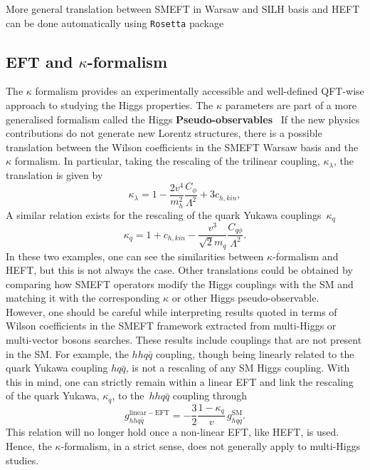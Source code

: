 More general translation between SMEFT in Warsaw and SILH basis and HEFT can be done automatically using \texttt{Rosetta} package~\cite{Falkowski:2015wza}
\subsection{EFT and $\kappa$-formalism \label{eftkappa}}
The $\kappa$ formalism provides an experimentally accessible and well-defined QFT-wise approach to studying the Higgs properties. The $\kappa$ parameters are part of a more generalised formalism called the Higgs \textbf{Pseudo-observables}~\cite{Gonzalez-Alonso:2014eva} 
If the new physics contributions do not generate new Lorentz structures, there is a possible translation between the Wilson coefficients in the SMEFT Warsaw basis and the $\kappa$ formalism. In particular, taking the rescaling of the trilinear coupling, $\kappa_\lambda$, the translation is given by
\begin{equation}
	\kappa_\lambda = 1-\frac{2v^4}{m_h^2} \frac{C_\phi}{\Lambda^2}+3 c_{h,kin},
\end{equation}
A similar relation exists for the rescaling of the quark Yukawa couplings~$\kappa_q$
\begin{equation}
	\kappa_q = 1+c_{h,kin}- \frac{v^3}{\sqrt{2}m_q}\frac{C_{q\phi}}{\Lambda^2}.
\end{equation}
In these two examples, one can see the similarities between $\kappa$-formalism and HEFT, but this is not always the case.  Other translations could be obtained by comparing how SMEFT operators modify the Higgs couplings with the SM and matching it with the corresponding $\kappa$ or other Higgs pseudo-observable.\\ 
However, one should be careful while interpreting results quoted in terms of Wilson coefficients in the SMEFT framework extracted from multi-Higgs or multi-vector bosons searches. These results include couplings that are not present in the SM. For example, the $hh q\bar{q}$ coupling, though being linearly related to the quark Yukawa coupling $h q\bar{q}$, is not a rescaling of any SM Higgs coupling. With this in mind, one can strictly remain within a linear EFT and link the rescaling of the quark Yukawa, $\kappa_q$, to the~$hh q\bar{q}$ coupling through
\begin{equation}
	g_{hhq\bar{q}}^{\mathrm{linear-EFT}} = -\frac{3}{2}\frac{1-\kappa_q}{v} \, g_{h q\bar{q}}^{\mathrm{SM}}.
\end{equation}
This relation will no longer hold once a non-linear EFT, like HEFT, is used. Hence, the $\kappa$-formalism, in a strict sense, does not generally apply to multi-Higgs studies.
